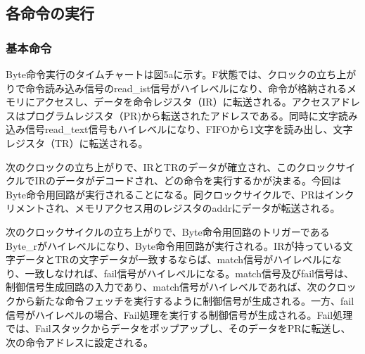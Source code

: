 \documentclass[submit]{ipsj}
\begin{document}

\subsection{各命令の実行}

\subsubsection{基本命令}

Byte命令実行のタイムチャートは図5aに示す。F状態では、クロックの立ち上がりで命令読み込み信号のread\_ist信号がハイレベルになり、命令が格納されるメモリにアクセスし、データを命令レジスタ（IR）に転送される。アクセスアドレスはプログラムレジスタ（PR)から転送されたアドレスである。同時に文字読み込み信号read\_text信号もハイレベルになり、FIFOから1文字を読み出し、文字レジスタ（TR）に転送される。

次のクロックの立ち上がりで、IRとTRのデータが確立され、このクロックサイクルでIRのデータがデコードされ、どの命令を実行するかが決まる。今回はByte命令用回路が実行されることになる。同クロックサイクルで、PRはインクリメントされ、メモリアクセス用のレジスタのaddrにデータが転送される。

次のクロックサイクルの立ち上がりで、Byte命令用回路のトリガーであるByte\_rがハイレベルになり、Byte命令用回路が実行される。IRが持っている文字データとTRの文字データが一致するならば、match信号がハイレベルになり、一致しなければ、fail信号がハイレベルになる。match信号及びfail信号は、制御信号生成回路の入力であり、match信号がハイレベルであれば、次のクロックから新たな命令フェッチを実行するように制御信号が生成される。一方、fail信号がハイレベルの場合、Fail処理を実行する制御信号が生成される。Fail処理では、Failスタックからデータをポップアップし、そのデータをPRに転送し、次の命令アドレスに設定される。
\end{document}
